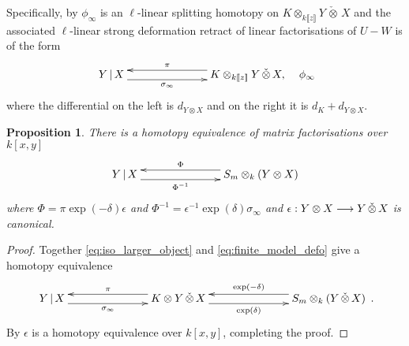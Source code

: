 \documentclass[english,letter paper,12pt,leqno]{article}
\newtheorem{proposition}[theorem]{Proposition}
\theoremstyle{example}
\numberwithin{equation}{section}
\begin{document}
Specifically, by \cite[Proposition 7.1]{dm1102.2957} $\phi_\infty$ is an $\ell$-linear splitting homotopy on $K \otimes_{k\llbracket z \rrbracket} Y \,\check{\otimes}\, X$ and the associated $\ell$-linear strong deformation retract of linear factorisations of $U - W$ is of the form
\begin{equation}\label{eq:finite_model_defo}
\xymatrix@C+4pc{
Y \l X \ar@<-1ex>[r]_-{\sigma_\infty} & K \otimes_{k\llbracket z \rrbracket} Y \,\check{\otimes}\, X, \ar@<-1ex>[l]_-{\pi}
} \quad \phi_\infty
\end{equation}
where the differential on the left is $d_{Y \otimes X}$ and on the right it is $d_K + d_{Y \otimes X}$. 

\begin{proposition}\label{prop:final_homotopy_equiv_cut} There is a homotopy equivalence of matrix factorisations over $k[x,y]$
\begin{equation}\label{eq:final_finite_model}
\xymatrix@C+4pc{
Y \l X \ar@<-1ex>[r]_-{\Phi^{-1}} & S_m \otimes_k ( Y \otimes X )\ar@<-1ex>[l]_-{\Phi}
}
\end{equation}
where $\Phi = \pi \exp(-\delta) \epsilon$ and $\Phi^{-1} = \epsilon^{-1} \exp(\delta) \sigma_\infty$ and $\epsilon: Y \otimes X \longrightarrow Y \,\check{\otimes}\, X$ is canonical.
\end{proposition}
\begin{proof}
Together \eqref{eq:iso_larger_object} and \eqref{eq:finite_model_defo} give a homotopy equivalence
\begin{equation}\label{eq:final_finite_model2}
\xymatrix@C+4pc{
Y \l X \ar@<-1ex>[r]_-{\sigma_\infty} & K \otimes Y \,\check{\otimes}\, X \ar@<-1ex>[l]_-{\pi} \ar@<-1ex>[r]_-{ \exp(\delta) } & S_m \otimes_k ( Y \,\check{\otimes}\, X ) \ar@<-1ex>[l]_-{ \exp(-\delta) }
}\,.
\end{equation}
By \cite[Remark 7.7]{dm1102.2957} $\epsilon$ is a homotopy equivalence over $k[x,y]$, completing the proof.
\end{proof}
\end{document}
